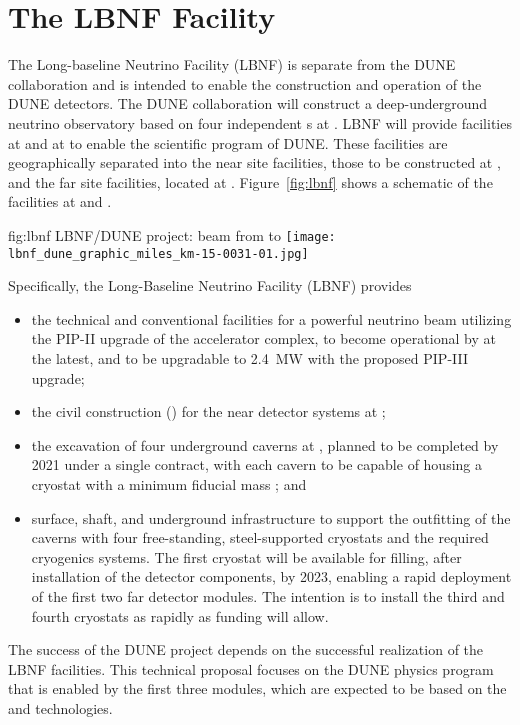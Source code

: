 \section{The LBNF Facility} %

The Long-baseline Neutrino
Facility (LBNF) is separate from the DUNE collaboration and is intended to enable the construction and operation of the DUNE detectors.
The DUNE collaboration will construct a deep-underground neutrino observatory based on four independent \nominalmodsize \lartpc{}s at \surf. %
LBNF will provide facilities at \fnal and at \surf to enable the scientific program of DUNE.
These facilities are geographically separated into the near site facilities, those to be constructed
at \fnal, and the far site facilities, located at \surf. Figure~\ref{fig:lbnf} shows
a schematic of the facilities at \fnal and \surf. 

\begin{dunefigure}{fig:lbnf}{ 	
LBNF/DUNE project: beam from \fnal to \surf}
\texttt{[image: lbnf\_dune\_graphic\_miles\_km-15-0031-01.jpg]}
\end{dunefigure}

Specifically, the Long-Baseline Neutrino Facility (LBNF) provides
\begin{itemize}

\item  the  technical and conventional facilities for a powerful  neutrino beam utilizing the PIP-II upgrade of the \fnal accelerator 
complex, to become operational by \beamturnon  
at the latest, and to be upgradable to \SI{2.4}{\MW} with the proposed 
PIP-III upgrade;

\item  the civil construction () for the near detector systems at \fnal; 

\item the excavation of four underground caverns at \surf, planned to be completed 
by 2021 
under a single contract, with each cavern to be capable of housing a cryostat with 
a minimum \nominalmodsize fiducial mass \lartpc; and


\item surface, shaft, and underground infrastructure to support 
the outfitting of the caverns with four free-standing, steel-supported cryostats 
and the required cryogenics systems. The first cryostat will be available for filling, after installation of the detector components, by
2023, enabling a rapid deployment of the first two \nominalmodsize far detector modules. 
The intention is to install the third and fourth cryostats as rapidly as funding will 
allow.

\end{itemize}
The success of the DUNE project depends on the successful realization of the LBNF facilities.
This technical proposal focuses on the DUNE physics program that is enabled by
the first three  modules, which are expected to be based on the \single and \dual \lar technologies. 

